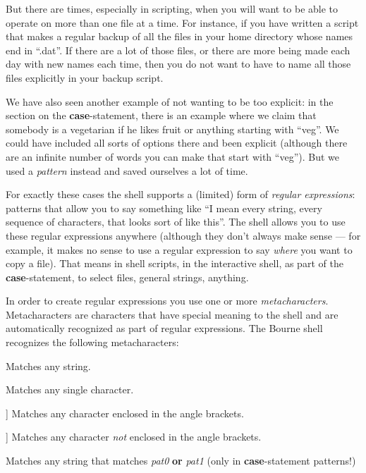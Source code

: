 But there are times, especially in scripting, when you will want to be able to
operate on more than one file at a time. For instance, if you have written a
script that makes a regular backup of all the files in your home directory
whose names end in ``.dat''. If there are a lot of those files, or there are
more being made each day with new names each time, then you do not want to have
to name all those files explicitly in your backup script.

We have also seen another example of not wanting to be too explicit: in the
section on the \textbf{case}-statement, there is an example where we claim that
somebody is a vegetarian if he likes fruit or anything starting with ``veg''.
We could have included all sorts of options there and been explicit (although
there are an infinite number of words you can make that start with ``veg'').
But we used a \emph{pattern} instead and saved ourselves a lot of time.

For exactly these cases the shell supports a (limited) form of \emph{regular
expressions}: patterns that allow you to say something like ``I mean every
string, every sequence of characters, that looks sort of like this''. The shell
allows you to use these regular expressions anywhere (although they don't
always make sense --- for example, it makes no sense to use a regular
expression to say \emph{where} you want to copy a file). That means in shell
scripts, in the interactive shell, as part of the \textbf{case}-statement, to
select files, general strings, anything.

In order to create regular expressions you use one or more
\emph{metacharacters}. Metacharacters are characters that have special meaning
to the shell and are automatically recognized as part of regular expressions.
The Bourne shell recognizes the following metacharacters:

\begin{description}
\setlength{\leftmargin}{0pt}
\setlength{\itemsep}{0pt}
\setlength{\parsep}{0pt}
\setlength{\parskip}{0pt}
	\item[\textbf{*}] Matches any string.
	\item[?] Matches any single character.
	\item[[\emph{characters}]] Matches any character enclosed in the angle
brackets.
	\item[[!\emph{characters}]] Matches any character \emph{not} enclosed in
the angle brackets.
	\item[\emph{pat0}\textbar{}\emph{pat1}] Matches any string that matches
\emph{pat0} \textbf{or} \emph{pat1} (only in \textbf{case}-statement patterns!)
\end{description}

